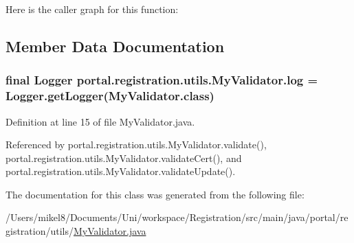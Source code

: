 Here is the caller graph for this function:




\subsection{Member Data Documentation}
\hypertarget{classportal_1_1registration_1_1utils_1_1MyValidator_ac3007a0c35777d54f57ea95450baef66}{
\subsubsection[{log}]{\setlength{\rightskip}{0pt plus 5cm}final Logger {\bf portal.registration.utils.MyValidator.log} = Logger.getLogger(MyValidator.class)}}
\label{classportal_1_1registration_1_1utils_1_1MyValidator_ac3007a0c35777d54f57ea95450baef66}


Definition at line 15 of file MyValidator.java.



Referenced by portal.registration.utils.MyValidator.validate(), portal.registration.utils.MyValidator.validateCert(), and portal.registration.utils.MyValidator.validateUpdate().



The documentation for this class was generated from the following file:\begin{DoxyCompactItemize}
\item 
/Users/mikel8/Documents/Uni/workspace/Registration/src/main/java/portal/registration/utils/\hyperlink{MyValidator_8java}{MyValidator.java}\end{DoxyCompactItemize}
